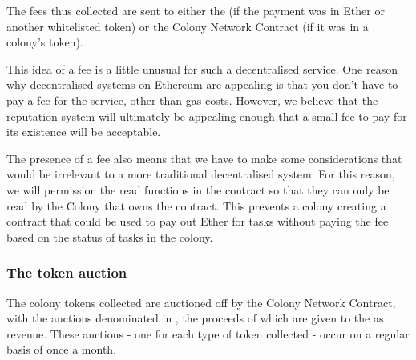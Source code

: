\begin{center}
\end{center}

The fees thus collected are sent to either the \rc (if the payment was in Ether or another whitelisted token) or the Colony Network Contract (if it was in a colony's token).


This idea of a fee is a little unusual for such a decentralised service. One reason why decentralised systems on Ethereum are appealing is that you don't have to pay a fee for the service, other than gas costs. However, we believe that the reputation system will ultimately be appealing enough that a small fee to pay for its existence will be acceptable.

The presence of a fee also means that we have to make some considerations that would be irrelevant to a more traditional decentralised system. For this reason, we will permission the read functions in the  contract so that they can only be read by the Colony that owns the  contract. This prevents a colony creating a contract that could be used to pay out Ether for tasks without paying the fee based on the status of tasks in the colony.

\subsubsection{The token auction}
The colony tokens collected are auctioned off by the Colony Network Contract, with the auctions denominated in \rcts, the proceeds of which are given to the \rc as revenue. These auctions - one for each type of token collected - occur on a regular basis of once a month.


